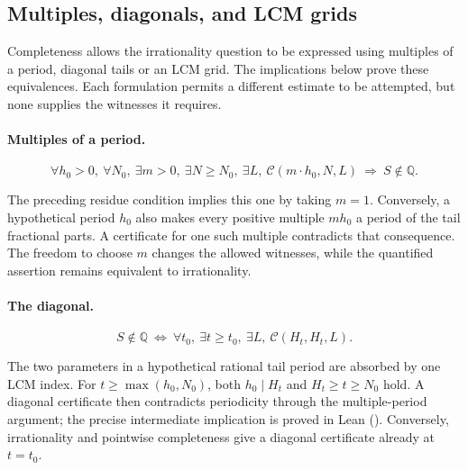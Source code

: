 \subsection{Multiples, diagonals, and LCM grids}


Completeness allows the irrationality question to be expressed using
multiples of a period, diagonal tails or an LCM grid. The implications
below prove these equivalences. Each formulation permits a different
estimate to be attempted, but none supplies the witnesses it requires.

\paragraph{Multiples of a period.}
\[
  \forall h_0>0,\ \forall N_0,\ \exists m>0,\ \exists N\ge N_0,\ \exists L,\
    \mathcal{C}(m\cdot h_0, N, L)
  \ \Longrightarrow\ S\notin\mathbb Q.
\]

The preceding residue condition implies this one by taking $m=1$.
Conversely, a hypothetical period $h_0$ also makes every positive
multiple $mh_0$ a period of the tail fractional parts. A certificate
for one such multiple contradicts that consequence. The freedom to
choose $m$ changes the allowed witnesses, while the quantified
assertion remains equivalent to irrationality.

\paragraph{The diagonal.}
\[
  S\notin\mathbb Q
  \ \Longleftrightarrow\
  \forall t_0,\ \exists t\ge t_0,\ \exists L,\
    \mathcal{C}(H_t, H_t, L).
\]

The two parameters in a hypothetical rational tail period are absorbed
by one LCM index. For $t\ge\max(h_0,N_0)$, both $h_0\mid H_t$ and
$H_t\ge t\ge N_0$ hold. A diagonal certificate then contradicts
periodicity through the multiple-period argument; the precise
intermediate implication is proved in Lean
().
Conversely, irrationality and pointwise completeness give a diagonal
certificate already at $t=t_0$.

